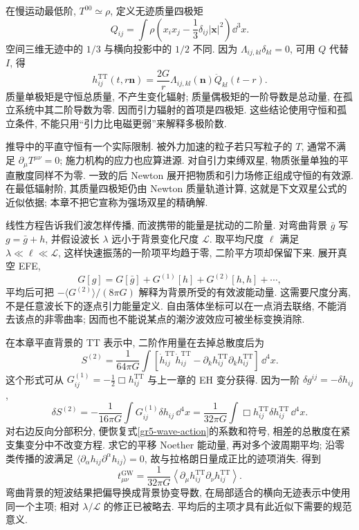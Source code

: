 在慢运动最低阶, $T^{00}\simeq\rho$, 定义无迹质量四极矩
\begin{equation}\label{gr5-quadrupole}
 Q_{ij}=\int\rho\left(x_ix_j-\frac13\delta_{ij}|\boldsymbol x|^2\right)\dd^3x.
\end{equation}
空间三维无迹中的 $1/3$ 与横向投影中的 $1/2$ 不同. 因为 $\Lambda_{ij,kl}\delta_{kl}=0$, 可用 $Q$ 代替 $I$, 得
\begin{equation}\label{gr5-wave-source}
 h^{\mathrm{TT}}_{ij}(t,r\boldsymbol n)=\frac{2G}{r}
                    \Lambda_{ij,kl}(\boldsymbol n)\ddot Q_{kl}(t-r).
\end{equation}
质量单极矩是守恒总质量, 不产生变化辐射; 质量偶极矩的一阶导数是总动量, 在孤立系统中其二阶导数为零. 因而引力辐射的首项是四极矩. 这些结论使用守恒和孤立条件, 不能只用“引力比电磁更弱”来解释多极阶数.

推导中的平直守恒有一个实际限制. 被外力加速的粒子若只写粒子的 $T$, 通常不满足 $\partial_\mu T^{\mu\nu}=0$; 施力机构的应力也应算进源. 对自引力束缚双星, 物质张量单独的平直散度同样不为零. 一致的后 Newton 展开把物质和引力场修正组成守恒的有效源. 在最低辐射阶, 其质量四极矩仍由 Newton 质量轨道计算, 这就是下文双星公式的近似依据; 本章不把它宣称为强场双星的精确解.


线性方程告诉我们波怎样传播, 而波携带的能量是扰动的二阶量. 对弯曲背景 $\bar g$ 写 $g=\bar g+h$, 并假设波长 $\lambda$ 远小于背景变化尺度 $\mathcal L$. 取平均尺度 $\ell$ 满足 $\lambda\ll\ell\ll\mathcal L$, 这样快速振荡的一阶项平均趋于零, 二阶平方项却保留下来. 展开真空 EFE,
\[
 G[g]=G[\bar g]+G^{(1)}[h]+G^{(2)}[h,h]+\cdots,
\]
平均后可把 $-\langle G^{(2)}\rangle/(8\pi G)$ 解释为背景所受的有效波能动量. 这需要尺度分离, 不是任意波长下的逐点引力能量定义. 自由落体坐标可以在一点消去联络, 不能消去该点的非零曲率; 因而也不能说某点的潮汐波效应可被坐标变换消除.

在本章平直背景的 TT 表示中, 二阶作用量在去掉总散度后为
\begin{equation}\label{gr5-wave-action}
 S^{(2)}=\frac1{64\pi G}\int
       [\dot h^{\mathrm{TT}}_{ij}\dot h^{\mathrm{TT}}_{ij}
       -\partial_kh^{\mathrm{TT}}_{ij}\partial_kh^{\mathrm{TT}}_{ij}]\,\dd^4x.
\end{equation}
这个形式可从 $G^{(1)}_{ij}=-\tfrac12\Box h^{\mathrm{TT}}_{ij}$ 与上一章的 EH 变分获得. 因为一阶 $\delta g^{ij}=-\delta h_{ij}$,
\[
 \delta S^{(2)}=-\frac1{16\pi G}\int G^{(1)}_{ij}\delta h_{ij}\,\dd^4x
       =\frac1{32\pi G}\int\Box h^{\mathrm{TT}}_{ij}\delta h^{\mathrm{TT}}_{ij}\,\dd^4x.
\]
对右边反向分部积分, 便恢复式\eqref{gr5-wave-action}的系数和符号, 相差的总散度在紧支集变分中不改变方程. 求它的平移 Noether 能动量, 再对多个波周期平均; 沿零类传播的波满足 $\langle\partial_\alpha h_{ij}\partial^\alpha h_{ij}\rangle=0$, 故与拉格朗日量成正比的迹项消失. 得到
\begin{equation}\label{gr5-energy-tensor}
 t^{\mathrm{GW}}_{\mu\nu}=\frac1{32\pi G}
      \left\langle\partial_\mu h^{\mathrm{TT}}_{ij}
                    \partial_\nu h^{\mathrm{TT}}_{ij}\right\rangle.
\end{equation}
弯曲背景的短波结果把偏导换成背景协变导数, 在局部适合的横向无迹表示中使用同一个主项; 相对 $\lambda/\mathcal L$ 的修正已被略去. 平均后的主项才具有此近似下需要的规范意义.

